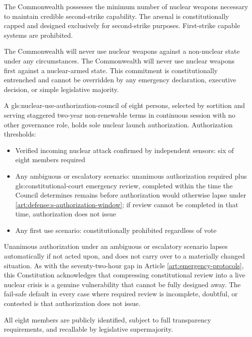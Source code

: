 The Commonwealth possesses the minimum number of nuclear weapons necessary to maintain credible second-strike capability. The arsenal is constitutionally capped and designed exclusively for second-strike purposes. First-strike capable systems are prohibited.

The Commonwealth will never use nuclear weapons against a non-nuclear state under any circumstances. The Commonwealth will never use nuclear weapons first against a nuclear-armed state. This commitment is constitutionally entrenched and cannot be overridden by any emergency declaration, executive decision, or simple legislative majority.

A \gls{gls:nuclear-use-authorization-council} of eight persons, selected by sortition and serving staggered two-year non-renewable terms in continuous session with no other governance role, holds sole nuclear launch authorization. Authorization thresholds:
\begin{itemize}
  \item Verified incoming nuclear attack confirmed by independent sensors: six of eight members required
  \item Any ambiguous or escalatory scenario: unanimous authorization required plus \gls{gls:constitutional-court} emergency review, completed within the time the Council determines remains before authorization would otherwise lapse under \ref{art:defense:s-authorization-window}; if review cannot be completed in that time, authorization does not issue
  \item Any first use scenario: constitutionally prohibited regardless of vote
\end{itemize}

Unanimous authorization under an ambiguous or escalatory scenario lapses automatically if not acted upon, and does not carry over to a materially changed situation. As with the seventy-two-hour gap in Article \ref{art:emergency-protocols}, this Constitution acknowledges that compressing constitutional review into a live nuclear crisis is a genuine vulnerability that cannot be fully designed away. The fail-safe default in every case where required review is incomplete, doubtful, or contested is that authorization does not issue.

All eight members are publicly identified, subject to full transparency requirements, and recallable by legislative supermajority.

